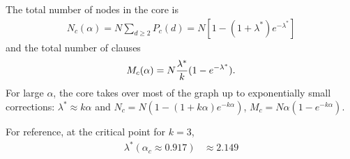 \documentclass[aps,pra,twocolumn,superscriptaddress,amsmath]{revtex4-1}
\newcommand{\f}[2]{{\ensuremath{\mathchoice%
       {\dfrac{#1}{#2}}
       {\dfrac{#1}{#2}}
       {\frac{#1}{#2}}
       {\frac{#1}{#2}}
       }}}
\begin{document}
The total number of nodes in the core is
\begin{align}
	N_c(\alpha) = N \sum_{d \ge 2} P_c(d) = N\left[ 1-(1+\lambda^*)e^{-\lambda^*}\right]
\end{align}
and the total number of clauses
\begin{align}
	M_c(\alpha) = N\f{\lambda^*}{k}(1-e^{-\lambda^*}).
\end{align}
For large $\alpha$, the core takes over most of the graph up to exponentially small corrections: $\lambda^* \approx k \alpha$ and $N_c = N(1- (1+k \alpha)e^{- k \alpha})$, $M_c = N \alpha(1-e^{-k\alpha})$.

For reference, at the critical point for $k=3$,
\begin{align}
	\lambda^*(\alpha_c \approx 0.917) &\approx 2.149
\end{align}


\end{document}
